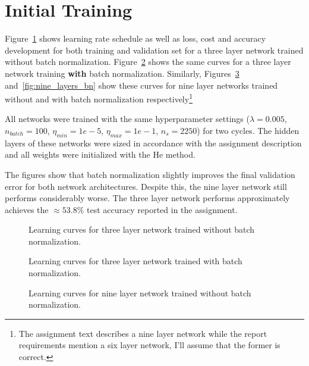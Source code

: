 \documentclass{article}
\begin{document}
\pagebreak

\section{Initial Training}

Figure~\ref{fig:three_layers} shows learning rate schedule as well as loss,
cost and accuracy development for both training and validation set for a three
layer network trained without batch normalization.
Figure~\ref{fig:three_layers_bn} shows the same curves for a three layer
network training \textbf{with} batch normalization.  Similarly,
Figures~\ref{fig:nine_layers} and~\ref{fig:nine_layers_bn} show these curves
for nine layer networks trained without and with batch normalization
respectively\footnote{The assignment text describes a nine layer network while
the report requirements mention a six layer network, I'll assume that the
former is correct.}

All networks were trained with the same hyperparameter settings
($\lambda = 0.005$, $n_{batch} = 100$, $\eta_{min} = 1e-5$, $\eta_{max} =
1e-1$, $n_s = 2250$) for two cycles. The hidden layers of these networks were
sized in accordance with the assignment description and all weights were
initialized with the He method.

The figures show that batch normalization slightly improves the final validation
error for both network architectures. Despite this, the nine layer network
still performs considerably worse. The three layer network performs approximately
achieves the $\approx53.8\%$ test accuracy reported in the assignment.

\pagebreak

\begin{figure}[H]
  \centering
    
  \caption{Learning curves for three layer network trained without batch
           normalization.}
  \label{fig:three_layers}
\end{figure}

\begin{figure}[H]
  \centering
    
  \caption{Learning curves for three layer network trained with batch
           normalization.}
  \label{fig:three_layers_bn}
\end{figure}

\begin{figure}[H]
  \centering
    
  \caption{Learning curves for nine layer network trained without batch
           normalization.}
  \label{fig:nine_layers}
\end{figure}
\end{document}
